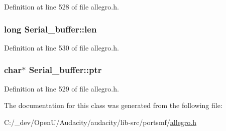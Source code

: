 Definition at line 528 of file allegro.\+h.

\subsubsection[{\texorpdfstring{len}{len}}]{\setlength{\rightskip}{0pt plus 5cm}long Serial\+\_\+buffer\+::len\hspace{0.3cm}{\ttfamily [protected]}}\hypertarget{class_serial__buffer_ac61bd539ff999551abc6f2723caa9602}{}\label{class_serial__buffer_ac61bd539ff999551abc6f2723caa9602}


Definition at line 530 of file allegro.\+h.

\subsubsection[{\texorpdfstring{ptr}{ptr}}]{\setlength{\rightskip}{0pt plus 5cm}char$\ast$ Serial\+\_\+buffer\+::ptr\hspace{0.3cm}{\ttfamily [protected]}}\hypertarget{class_serial__buffer_ab39b90533bf801d77ab85c4543360297}{}\label{class_serial__buffer_ab39b90533bf801d77ab85c4543360297}


Definition at line 529 of file allegro.\+h.



The documentation for this class was generated from the following file\+:\begin{DoxyCompactItemize}
\item 
C\+:/\+\_\+dev/\+Open\+U/\+Audacity/audacity/lib-\/src/portsmf/\hyperlink{allegro_8h}{allegro.\+h}\end{DoxyCompactItemize}
